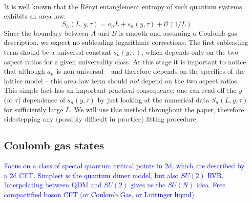 \documentclass[11pt]{iopart}
\begin{document}
\paragraph{}
 It is well known that the R\'enyi entanglement entropy of such quantum systems exhibits an area law\cite{ALreview}:
 \begin{equation}
 S_n(L,y,\tau)= a_{n} L+s_{n}(y,\tau)+\mathcal{O}(1/L)
\end{equation}
Since the boundary between $A$ and $B$ is smooth and assuming a Coulomb gas description, we expect no subleading logarithmic corrections\cite{Hsu2009}. The first subleading term should be a universal constant $s_n(y,\tau)$, which depends only on the two aspect ratios for a given universality class. At this stage it is important to notice that although $a_n$ is non-universal -- and therefore depends on the specifics of the lattice model -- this area law term should \emph{not} depend on the two aspect ratios. This simple fact has an important practical consequence: one can read off the $y$ (or $\tau$) dependence of $s_n(y,\tau)$ by just looking at the numerical data $S_n(L,y,\tau)$ for sufficiently large $L$. We will use this method\cite{Ju2012} throughout the paper, therefore sidestepping any  (possibly difficult in practice) fitting procedure.    
\subsection{Coulomb gas states}
\label{sec:cg}
\textcolor{blue}{Focus on a class of special quantum critical points in 2d, which are described by a 2d CFT. Simplest is the quantum dimer model, but also $SU(2)$ RVB. 
Interpolating between QDM and $SU(2)$ gives us the $SU(N)$ idea. Free compactified boson CFT (or Coulomb Gas, or Luttinger liquid)}
\end{document}
